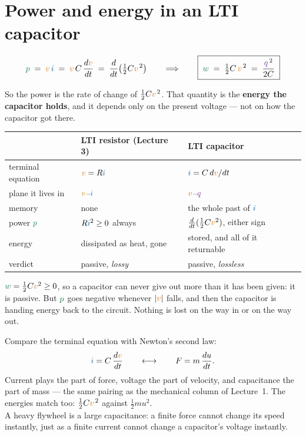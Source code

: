 \documentclass[11pt,a4paper]{article}
\newcommand{\Icol}[1]{\textcolor{ccur}{#1}}
\newcommand{\Vcol}[1]{\textcolor{cvolt}{#1}}
\newcommand{\Pcol}[1]{\textcolor{cpow}{#1}}
\newcommand{\Qcol}[1]{\textcolor{ccharge}{#1}}
\begin{document}
\section{Power and energy in an LTI capacitor}
\label{sec:energy}

\[
  \Pcol{p} \;=\; \Vcol{v}\,\Icol{i} \;=\; \Vcol{v}\,C\,\frac{d\Vcol{v}}{dt}
  \;=\; \frac{d}{dt}\!\left(\tfrac12 C \Vcol{v}^{\,2}\right)
  \qquad\Longrightarrow\qquad
  \boxed{\;\Pcol{w} \;=\; \tfrac12 C\,\Vcol{v}^{\,2} \;=\; \frac{\Qcol{q}^{\,2}}{2C}\;}
\]

So the power is the rate of change of $\tfrac12 C \Vcol{v}^{\,2}$. That quantity is the
\textbf{energy the capacitor holds}, and it depends only on the present voltage --- not on
how the capacitor got there.

\begin{center}
\small
\begin{tabular}{@{}l l l@{}}
\toprule
 & \textbf{LTI resistor} \footnotesize(Lecture 3) & \textbf{LTI capacitor}\\
\midrule
terminal equation & $\Vcol{v} = R\Icol{i}$ & $\Icol{i} = C\,d\Vcol{v}/dt$\\
plane it lives in & $\Vcol{v}$--$\Icol{i}$ & $\Vcol{v}$--$\Qcol{q}$\\
memory            & none & the whole past of $\Icol{i}$\\
power $\Pcol{p}$  & $R\Icol{i}^2 \ge 0$ always & $\tfrac{d}{dt}(\tfrac12 C\Vcol{v}^2)$, either sign\\
energy            & dissipated as heat, gone & stored, and all of it returnable\\
verdict           & passive, \emph{lossy} & passive, \emph{lossless}\\
\bottomrule
\end{tabular}
\end{center}

$\Pcol{w} = \tfrac12 C\Vcol{v}^2 \ge 0$, so a capacitor can never give out more than it has
been given: it is passive. But $\Pcol{p}$ goes negative whenever $|\Vcol{v}|$ falls, and
then the capacitor is handing energy back to the circuit. Nothing is lost on the way in or
on the way out.

\begin{ideabox}
Compare the terminal equation with Newton's second law:
\[
  \Icol{i} = C\,\frac{d\Vcol{v}}{dt}
  \qquad\longleftrightarrow\qquad
  F = m\,\frac{du}{dt} .
\]
Current plays the part of force, voltage the part of velocity, and capacitance the part of
mass --- the same pairing as the mechanical column of Lecture~1. The energies match too:
$\tfrac12 C\Vcol{v}^{\,2}$ against $\tfrac12 m u^2$.\\[3pt]
A heavy flywheel is a large capacitance: a finite force cannot change its speed instantly,
just as a finite current cannot change a capacitor's voltage instantly.
\end{ideabox}
\end{document}
